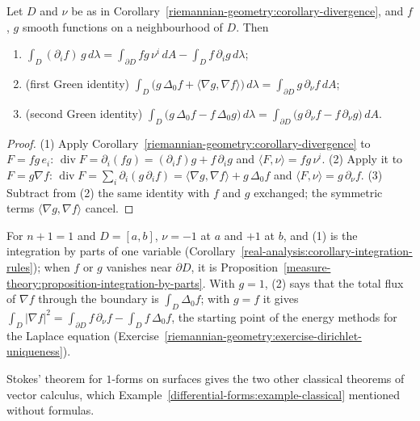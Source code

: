 \begin{corollary}\label{riemannian-geometry:corollary-green-identities}
Let $D$ and $\nu$ be as in Corollary~\ref{riemannian-geometry:corollary-divergence}, and $f$, $g$ smooth functions on a neighbourhood of $D$. Then
\begin{enumerate}
\item $\displaystyle\int_D(\partial_if)\,g\,d\lambda = \int_{\partial D}fg\,\nu^i\,dA - \int_Df\,\partial_ig\,d\lambda$;
\item (first Green identity) $\displaystyle\int_D\bigl(g\,\Delta_0f + \langle\nabla g, \nabla f\rangle\bigr)\,d\lambda = \int_{\partial D}g\,\partial_\nu f\,dA$;
\item (second Green identity) $\displaystyle\int_D\bigl(g\,\Delta_0f - f\,\Delta_0g\bigr)\,d\lambda = \int_{\partial D}\bigl(g\,\partial_\nu f - f\,\partial_\nu g\bigr)\,dA$.
\end{enumerate}
\end{corollary}

\begin{proof}
(1) Apply Corollary~\ref{riemannian-geometry:corollary-divergence} to $F = fg\,e_i$: $\operatorname{div}F = \partial_i(fg) = (\partial_if)g + f\,\partial_ig$ and $\langle F, \nu\rangle = fg\,\nu^i$. (2) Apply it to $F = g\nabla f$:
$\operatorname{div}F = \sum_i\partial_i(g\,\partial_if) = \langle\nabla g, \nabla f\rangle + g\,\Delta_0f$ and $\langle F, \nu\rangle = g\,\partial_\nu f$. (3) Subtract from (2) the same identity with $f$ and $g$ exchanged; the
symmetric terms $\langle\nabla g, \nabla f\rangle$ cancel.
\end{proof}

For $n + 1 = 1$ and $D = [a, b]$, $\nu = -1$ at $a$ and $+1$ at $b$, and (1) is the integration by parts of one variable (Corollary~\ref{real-analysis:corollary-integration-rules}); when $f$ or $g$ vanishes
near $\partial D$, it is Proposition~\ref{measure-theory:proposition-integration-by-parts}. With $g = 1$, (2) says that the total flux of $\nabla f$ through the boundary is $\int_D\Delta_0f$; with $g = f$ it gives
$\int_D|\nabla f|^2 = \int_{\partial D}f\,\partial_\nu f - \int_Df\,\Delta_0f$, the starting point of the energy methods for the Laplace equation (Exercise~\ref{riemannian-geometry:exercise-dirichlet-uniqueness}).

Stokes' theorem for $1$-forms on surfaces gives the two other classical theorems of vector calculus, which Example~\ref{differential-forms:example-classical} mentioned without formulas.

